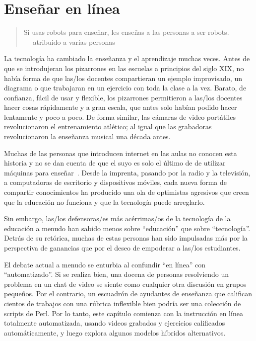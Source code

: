 \chapter{Enseñar en línea}\label{s:online}

\begin{quote}

 Si usas robots para enseñar, les enseñas a las personas a ser robots. \\
  --- atribuido a varias personas

\end{quote}

La tecnología ha cambiado la enseñanza y el aprendizaje muchas veces.
Antes de que se introdujeran los pizarrones en las escuelas a principios del siglo XIX,
no había forma de que las/los docentes compartieran un ejemplo improvisado,
un diagrama
o que trabajaran en un ejercicio con toda la clase a la vez.
Barato,
de confianza,
fácil de usar
y flexible,
los pizarrones permitieron a las/los docentes hacer cosas rápidamente y a gran escala,
que antes solo habían podido hacer lentamente y poco a poco.
De forma similar,
las cámaras de video portátiles revolucionaron el entrenamiento atlético;
al igual que las grabadoras revolucionaron la enseñanza musical una década antes.

Muchas de las personas que introducen internet en las aulas no conocen esta historia
y no se dan cuenta de que el suyo es solo el último de  
de utilizar máquinas para enseñar~\cite{Watt2014}.
Desde la imprenta, pasando por la radio y la televisión,
a computadoras de escritorio y dispositivos móviles,
cada nueva forma de compartir conocimientos ha producido una ola de optimistas agresivos
que creen que la educación no funciona y que la tecnología puede arreglarlo.

Sin embargo,
las/los defensoras/es más acérrimas/os de la tecnología de la educación a menudo han sabido menos sobre ``educación'' que sobre ``tecnología''.
Detrás de su retórica,
muchas de estas personas han sido impulsadas más por la perspectiva de ganancias
que por el deseo de empoderar a las/los estudiantes.

El debate actual a menudo se enturbia al confundir ``en línea'' con ``automatizado''.
Si se realiza bien,
una docena de personas resolviendo un problema en un chat de video
se siente como cualquier otra discusión en grupos pequeños.
Por el contrario,
un escuadrón de ayudantes de enseñanza que califican cientos de trabajos con una rúbrica inflexible
bien podría ser una colección de scripts de Perl.
Por lo tanto, este capítulo comienza con la instrucción en línea totalmente automatizada,
usando videos grabados y ejercicios calificados automáticamente,
y luego explora algunos modelos híbridos alternativos.

